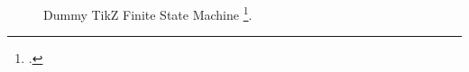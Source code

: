 \begin{frame}
    \begin{figure}[t]
        \begin{center}
            \caption{Dummy TikZ Finite State Machine \footcite{ML-Converters:Rodriguez2002}.}
            \label{fig:FSM_1}  
        \end{center}
    \end{figure}
\end{frame}
